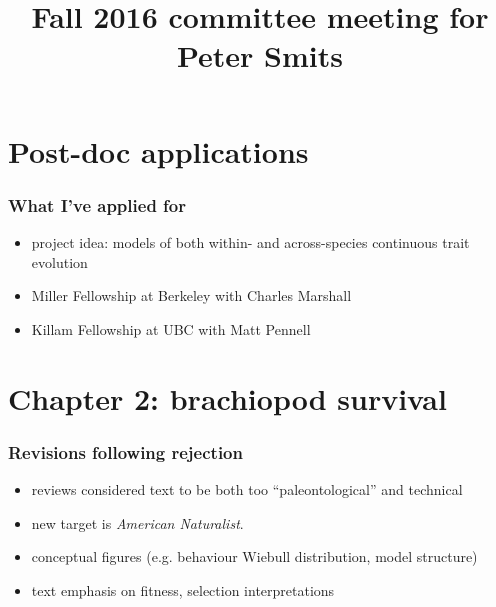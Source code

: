 \documentclass{beamer}
\title{Fall 2016 committee meeting for Peter Smits}
\author{}
\institute{}
\date{}
\begin{document}
\begin{frame}
  \maketitle
\end{frame}

\begin{frame}
  \tableofcontents
\end{frame}

\section{Post-doc applications}
\begin{frame}
  \frametitle{What I've applied for}
  \begin{itemize}
    \item project idea: models of both within- and across-species continuous trait evolution
    \item Miller Fellowship at Berkeley with Charles Marshall
    \item Killam Fellowship at UBC with Matt Pennell
  \end{itemize}
\end{frame}

\section{Chapter 2: brachiopod survival}
\begin{frame}
  \frametitle{Revisions following rejection}

  \begin{itemize}
    \item reviews considered text to be both too ``paleontological'' and technical
    \item new target is \textit{American Naturalist}.
    \item conceptual figures (e.g. behaviour Wiebull distribution, model structure)
    \item text emphasis on fitness, selection interpretations
  \end{itemize}
\end{frame}
\end{document}
